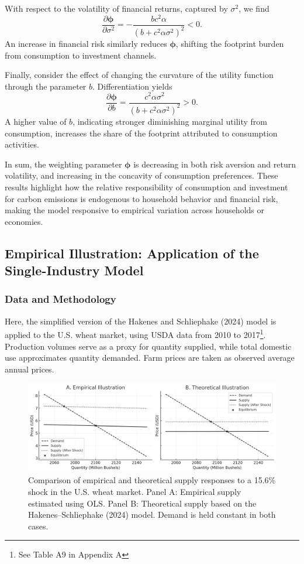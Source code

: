 \documentclass[12pt,a4paper]{article}%
\begin{document}
With respect to the volatility of financial returns, captured by \( \sigma^2 \), we find
\[
\frac{\partial \boldsymbol{\phi}}{\partial \sigma^2} = -\frac{b c^2 \alpha}{{(b + c^2 \alpha \sigma^2)}^2} < 0.
\]
An increase in financial risk similarly reduces \( \boldsymbol{\phi} \), shifting the footprint burden from consumption to investment channels.

Finally, consider the effect of changing the curvature of the utility function through the parameter \( b \). Differentiation yields
\[
\frac{\partial \boldsymbol{\phi}}{\partial b} = \frac{c^2 \alpha \sigma^2}{{(b + c^2 \alpha \sigma^2)}^2} > 0.
\]
A higher value of \( b \), indicating stronger diminishing marginal utility from consumption, increases the share of the footprint attributed to consumption activities.

In sum, the weighting parameter \( \boldsymbol{\phi} \) is decreasing in both risk aversion and return volatility, and increasing in the concavity of consumption preferences. These results highlight how the relative responsibility of consumption and investment for carbon emissions is endogenous to household behavior and financial risk, making the model responsive to empirical variation across households or economies.

\subsection{Empirical Illustration: Application of the Single-Industry Model}

\subsubsection{Data and Methodology}
Here, the simplified version of the Hakenes and Schliephake (2024) model is applied to the U.S. wheat market, using USDA data from 2010 to 2017\footnote{See Table A9 in Appendix A}. Production volumes serve as a proxy for quantity supplied, while total domestic use approximates quantity demanded. Farm prices are taken as observed average annual prices.

\begin{figure}[ht]
    \centering
    \includegraphics[width=\textwidth]{Hakenes illustration.png}
    \caption{\small{Comparison of empirical and theoretical supply responses to a 15.6\% shock in the U.S. wheat market. Panel A: Empirical supply estimated using OLS. Panel B: Theoretical supply based on the Hakenes–Schliephake (2024) model. Demand is held constant in both cases.}}
\end{figure}
\end{document}
